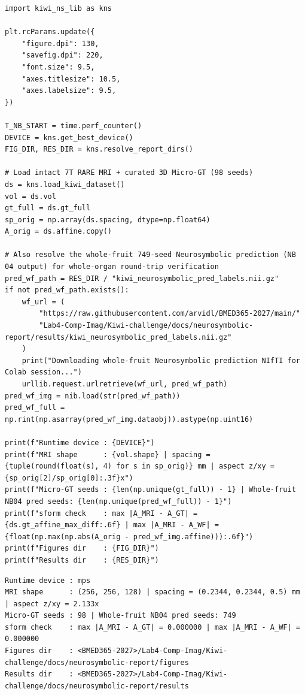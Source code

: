 \documentclass[10pt,a4paper]{article}
\renewcommand{\_}{\origunderscore\allowbreak}
\begin{document}
\begin{codebox}
\begin{lstlisting}[style=pybmed]
import kiwi_ns_lib as kns

plt.rcParams.update({
    "figure.dpi": 130,
    "savefig.dpi": 220,
    "font.size": 9.5,
    "axes.titlesize": 10.5,
    "axes.labelsize": 9.5,
})

T_NB_START = time.perf_counter()
DEVICE = kns.get_best_device()
FIG_DIR, RES_DIR = kns.resolve_report_dirs()

# Load intact 7T RARE MRI + curated 3D Micro-GT (98 seeds)
ds = kns.load_kiwi_dataset()
vol = ds.vol
gt_full = ds.gt_full
sp_orig = np.array(ds.spacing, dtype=np.float64)
A_orig = ds.affine.copy()

# Also resolve the whole-fruit 749-seed Neurosymbolic prediction (NB 04 output) for whole-organ round-trip verification
pred_wf_path = RES_DIR / "kiwi_neurosymbolic_pred_labels.nii.gz"
if not pred_wf_path.exists():
    wf_url = (
        "https://raw.githubusercontent.com/arvidl/BMED365-2027/main/"
        "Lab4-Comp-Imag/Kiwi-challenge/docs/neurosymbolic-report/results/kiwi_neurosymbolic_pred_labels.nii.gz"
    )
    print("Downloading whole-fruit Neurosymbolic prediction NIfTI for Colab session...")
    urllib.request.urlretrieve(wf_url, pred_wf_path)
pred_wf_img = nib.load(str(pred_wf_path))
pred_wf_full = np.rint(np.asarray(pred_wf_img.dataobj)).astype(np.uint16)

print(f"Runtime device : {DEVICE}")
print(f"MRI shape      : {vol.shape} | spacing = {tuple(round(float(s), 4) for s in sp_orig)} mm | aspect z/xy = {sp_orig[2]/sp_orig[0]:.3f}x")
print(f"Micro-GT seeds : {len(np.unique(gt_full)) - 1} | Whole-fruit NB04 pred seeds: {len(np.unique(pred_wf_full)) - 1}")
print(f"sform check    : max |A_MRI - A_GT| = {ds.gt_affine_max_diff:.6f} | max |A_MRI - A_WF| = {float(np.max(np.abs(A_orig - pred_wf_img.affine))):.6f}")
print(f"Figures dir    : {FIG_DIR}")
print(f"Results dir    : {RES_DIR}")
\end{lstlisting}
\end{codebox}
\begin{outbox}
\begin{lstlisting}[style=outbmed]
Runtime device : mps
MRI shape      : (256, 256, 128) | spacing = (0.2344, 0.2344, 0.5) mm | aspect z/xy = 2.133x
Micro-GT seeds : 98 | Whole-fruit NB04 pred seeds: 749
sform check    : max |A_MRI - A_GT| = 0.000000 | max |A_MRI - A_WF| = 0.000000
Figures dir    : <BMED365-2027>/Lab4-Comp-Imag/Kiwi-challenge/docs/neurosymbolic-report/figures
Results dir    : <BMED365-2027>/Lab4-Comp-Imag/Kiwi-challenge/docs/neurosymbolic-report/results
\end{lstlisting}
\end{outbox}
\end{document}
